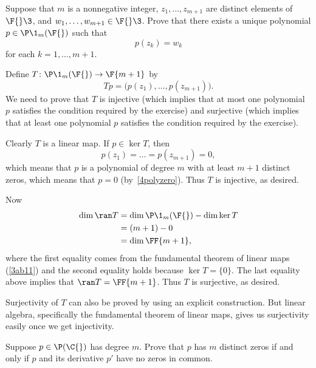 \exercise
Suppose that $m$ is a nonnegative integer, $z_1, \dots, z_{m+1}$ are distinct elements of $\F{}\3$, and
$w_1, \dots, w_{m+1} \in \F{}\3$.  Prove that there exists a unique polynomial
$p \in \P\1_m(\F{})$ such that \label{PolyInterpolation}
\[
p(z_k) = w_k
\]
for each $k = 1, \dots, m + 1$.

\begin{Solution}
Define $T \colon \P\1_m(\F{}) \to \F{m+1}$ by
\[
Tp = \bigl(p(z_1), \dots, p(z_{m+1})\bigr).
\]
We need to prove that $T$ is injective (which implies that at most one
polynomial $p$ satisfies the condition required by the exercise) and surjective
(which implies that at least one polynomial $p$ satisfies the condition required
by the exercise).

Clearly $T$ is a linear map.  If $p \in \ker T$, then
\[
p(z_1) = \dots = p(z_{m+1}) = 0,
\]
which means that $p$ is a polynomial of degree $m$ with at least $m+1$ distinct
zeros, which means that $p = 0$ (by~\ref{4polyzero}).  Thus $T$ is injective, as
desired.

Now
\begin{align*}
\dim \ran T &= \dim \P\1_m(\F{}) - \dim \ker T \\
&= (m + 1) - 0 \\
&= \dim \FF{m+1},
\end{align*}
where the first equality comes from the fundamental theorem of linear maps (\ref{3ab11}) and the second equality holds
because $\ker T = \{0\}$.  The last equality above implies that
$\ran T = \FF{m + 1}$.  Thus $T$ is surjective, as desired.

\Comment
Surjectivity of $T$ can also be proved by using an explicit construction.  But
linear algebra, specifically the fundamental theorem of linear maps, gives us surjectivity easily once we get
injectivity.
\end{Solution}

\exercise
Suppose $p \in \P(\C{})$ has degree $m$.  Prove that $p$ has $m$ distinct zeros if
and only if $p$ and its derivative $p'$ have no zeros in common.

